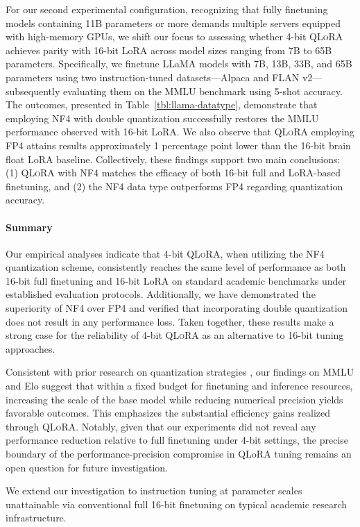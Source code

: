 For our second experimental configuration, recognizing that fully finetuning models containing 11B parameters or more demands multiple servers equipped with high-memory GPUs, we shift our focus to assessing whether 4-bit \textsc{QLoRA} achieves parity with 16-bit LoRA across model sizes ranging from 7B to 65B parameters. Specifically, we finetune LLaMA models with 7B, 13B, 33B, and 65B parameters using two instruction-tuned datasets—Alpaca and FLAN v2—subsequently evaluating them on the MMLU benchmark using 5-shot accuracy. The outcomes, presented in Table~\ref{tbl:llama-datatype}, demonstrate that employing NF4 with double quantization successfully restores the MMLU performance observed with 16-bit LoRA. We also observe that \textsc{QLoRA} employing FP4 attains results approximately 1 percentage point lower than the 16-bit brain float LoRA baseline. Collectively, these findings support two main conclusions: (1) \textsc{QLoRA} with NF4 matches the efficacy of both 16-bit full and LoRA-based finetuning, and (2) the NF4 data type outperforms FP4 regarding quantization accuracy.

\paragraph{Summary} Our empirical analyses indicate that 4-bit \textsc{QLoRA}, when utilizing the NF4 quantization scheme, consistently reaches the same level of performance as both 16-bit full finetuning and 16-bit LoRA on standard academic benchmarks under established evaluation protocols. Additionally, we have demonstrated the superiority of NF4 over FP4 and verified that incorporating double quantization does not result in any performance loss. Taken together, these results make a strong case for the reliability of 4-bit \textsc{QLoRA} as an alternative to 16-bit tuning approaches.

Consistent with prior research on quantization strategies \citep{dettmers2022case}, our findings on MMLU and Elo suggest that within a fixed budget for finetuning and inference resources, increasing the scale of the base model while reducing numerical precision yields favorable outcomes. This emphasizes the substantial efficiency gains realized through \textsc{QLoRA}. Notably, given that our experiments did not reveal any performance reduction relative to full finetuning under 4-bit settings, the precise boundary of the performance-precision compromise in QLoRA tuning remains an open question for future investigation.

We extend our investigation to instruction tuning at parameter scales unattainable via conventional full 16-bit finetuning on typical academic research infrastructure.

